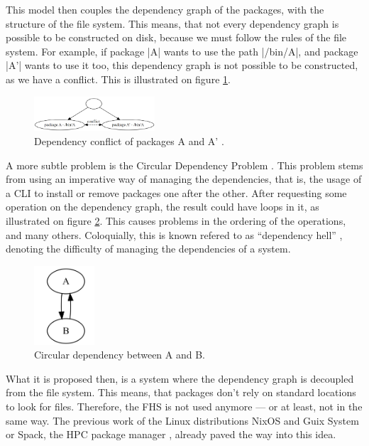 This model then couples the dependency graph of the packages, with the structure
of the file system. This means, that not every dependency graph is possible to
be constructed on disk, because we must follow the rules of the file system. For
example, if package |A| wants to use the path |/bin/A|, and package |A'| wants
to use it too, this dependency graph is not possible to be constructed, as we
have a conflict. This is illustrated on figure \ref{fig:graph2}.

\begin{figure}
    \centering
    \includegraphics[width=0.4\textwidth]{Screenshot 2023-05-29 153351.png}
    \caption{Dependency conflict of packages A and A' .}
    \label{fig:graph2}
\end{figure}

A more subtle problem is the Circular Dependency Problem \cite{al-mutawaShapeCircularDependencies2014}. This problem stems
from using an imperative way of managing the dependencies, that is, the usage of
a \ac{CLI} to install or remove packages one after the
other. After requesting some operation on the dependency graph, the result could have
loops in it, as illustrated on figure \ref{fig:graph3}. This causes problems in
the ordering of the operations, and many others. Coloquially, this is known refered to as
``dependency hell'' \cite{abateDependencySolvingStill2020}, denoting the difficulty of managing the dependencies of a system.

\begin{figure}
    \centering
    \includegraphics[width=0.2\textwidth]{Screenshot 2023-05-29 154056.png}
    \caption{Circular dependency between A and B.}
    \label{fig:graph3}
\end{figure}

What it is proposed then, is a system where the dependency graph is decoupled
from the file system. This means, that packages don't rely on standard locations
to look for files. Therefore, the \ac{FHS} is not used anymore --- or at least, not
in the same way. The previous work of the Linux distributions
NixOS \cite{dolstraPurelyFunctionalSoftware2006} and Guix System
\cite{courtesFunctionalPackageManagement2013} or Spack, the \ac{HPC} package
manager \cite{gamblinSpackPackageManager2015}, already paved the way into this idea.

